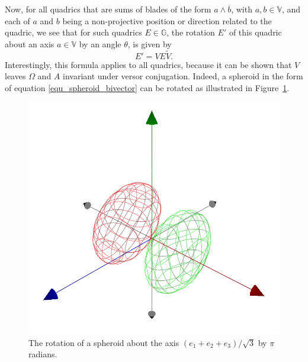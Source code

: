 \documentclass[12pt]{article}
\newcommand{\G}{\mathbb{G}}
\newcommand{\V}{\mathbb{V}}
\numberwithin{equation}{section}
\begin{document}
Now, for all quadrics
that are sums of blades of the form $a\wedge\overline{b}$, with $a,b\in\V$,
and each of $a$ and $b$ being a non-projective position or direction related to the quadric,
we see that for such quadrics $E\in\G$, the rotation $E'$ of this quadric
about an axis $a\in\V$ by an angle $\theta$, is given by
\begin{equation}
E' = VE\tilde{V}.
\end{equation}
Interestingly, this formula applies to all quadrics, because it can be shown
that $V$ leaves $\Omega$ and $A$ invariant under versor conjugation.
Indeed, a spheroid in the form of equation \eqref{equ_spheroid_bivector}
can be rotated as illustrated in Figure~\ref{fig_rot_spheroid}.
\begin{figure}
\includegraphics[scale=0.7]{RotatedSpheroid}
\caption{The rotation of a spheroid about the axis $(e_1+e_2+e_3)/\sqrt{3}$ by $\pi$ radians.}
\label{fig_rot_spheroid}
\end{figure}
\end{document}
